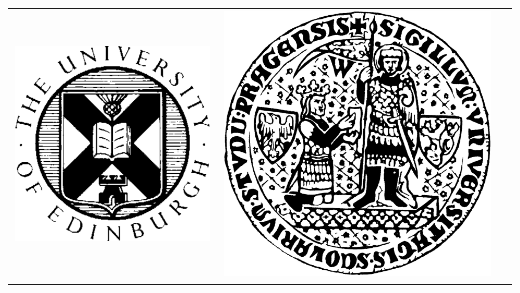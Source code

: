 \documentclass[landscape]{uedslides2C}
\begin{document}

\vspace{5mm}
\begin{table}[h]
\begin{center}
\begin{tabular}{ c  c  c } 

\includegraphics[scale=0.3]{univ-edinburgh.pdf}
&
\includegraphics[scale=0.07]{charles.png}

\end{tabular}
\end{center}
\end{table}
\end{document}
